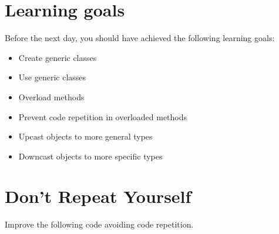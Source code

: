 \documentclass{article}
\begin{document}
\section*{Learning goals}
\label{sec:learning-goals}

Before the next day, you should have achieved the following learning
goals: 

\begin{itemize}
\item Create generic classes
\item Use generic classes
\item Overload methods
\item Prevent code repetition in overloaded methods
\item Upcast objects to more general types
\item Downcast objects to more specific types
\end{itemize}

\section{Don't Repeat Yourself}
\label{sec:dont-repeat-yourself}

Improve the following code avoiding code repetition. 





\end{document}
